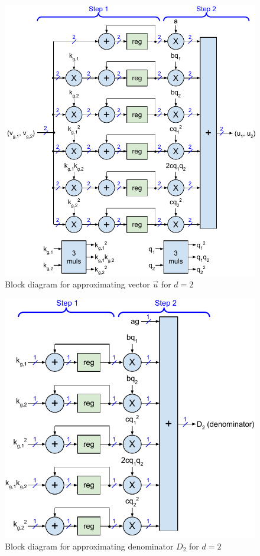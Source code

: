 \documentclass{article}
\numberwithin{equation}{section} %
\def\u{\vec{u}}
\begin{document}
\begin{figure}[h!] \centering  %
  \includegraphics[scale=0.86]{figs/approximate_fig3.pdf}
  \caption{Block diagram for approximating vector $\u$ for $d=2$}
\label{fig3} \end{figure}

\begin{figure} \centering
  \includegraphics[scale=0.86]{figs/approximate_fig4.pdf}
  \caption{Block diagram for approximating denominator $D_2$ for $d=2$}
\label{fig4} \end{figure}
\end{document}
